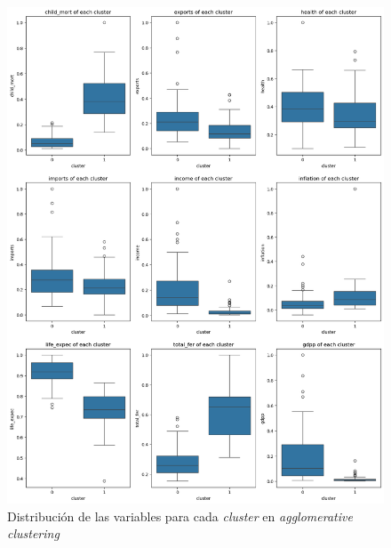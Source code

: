 \documentclass{article}
\begin{document}
\begin{figure}[H]
  \centering
  \includegraphics[width=0.68\linewidth]{../images/agglomerative/features-dist.png}
  \caption{Distribución de las variables para cada \textit{cluster} en \textit{agglomerative clustering}}
  \label{fig:agglomerative-features}
\end{figure}

\printbibliography
\end{document}

